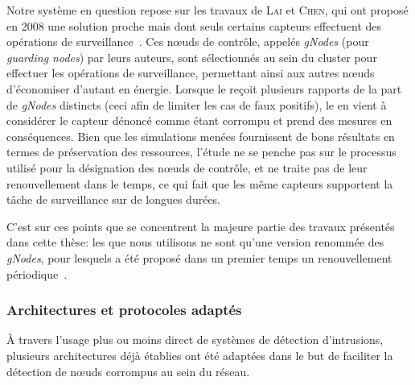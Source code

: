 Notre système en question repose sur les travaux de \textsc{Lai} et \textsc{Chen}, qui ont proposé en 2008 une solution proche mais dont seuls certains capteurs effectuent des opérations de surveillance~\cite{LC08}.
Ces nœuds de contrôle, appelés \textit{gNodes} (pour \textit{guarding nodes}) par leurs auteurs, sont sélectionnés au sein du cluster pour effectuer les opérations de surveillance, permettant ainsi aux autres nœuds d'économiser d'autant en énergie.
Lorsque le \ch reçoit plusieurs rapports de la part de \textit{gNodes} distincts (ceci afin de limiter les cas de faux positifs), le \CH en vient à considérer le capteur dénoncé comme étant corrompu et prend des mesures en conséquences.
Bien que les simulations menées fournissent de bons résultats en termes de préservation des ressources, l'étude ne se penche pas sur le processus utilisé pour la désignation des nœuds de contrôle, et ne traite pas de leur renouvellement dans le temps, ce qui fait que les même capteurs supportent la tâche de surveillance sur de longues durées.

C'est sur ces points que se concentrent la majeure partie des travaux présentés dans cette thèse: les \cns que nous utilisons ne sont qu'une version renommée des \textit{gNodes}, pour lesquels a été proposé dans un premier temps un renouvellement périodique~\cite{GMT12}.

\subsubsection{Architectures et protocoles adaptés}
À travers l'usage plus ou moins direct de systèmes de détection d'intrusions, plusieurs architectures déjà établies ont été adaptées dans le but de faciliter la détection de nœuds corrompus au sein du réseau.

